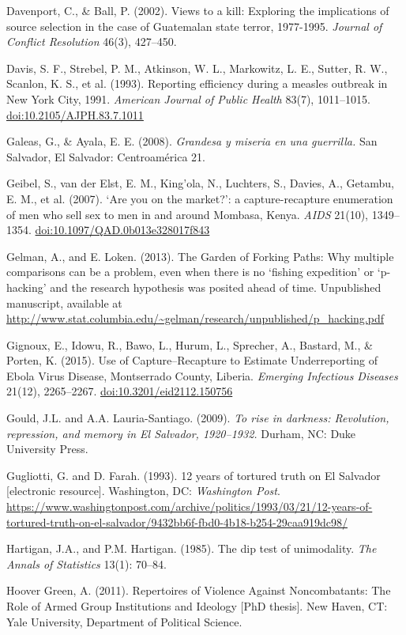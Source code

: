 \documentclass[11pt,]{article}
\begin{document}
Davenport, C., \& Ball, P. (2002). Views to a kill: Exploring the
implications of source selection in the case of Guatemalan state terror,
1977-1995. \emph{Journal of Conflict Resolution} 46(3), 427--450.

Davis, S. F., Strebel, P. M., Atkinson, W. L., Markowitz, L. E., Sutter,
R. W., Scanlon, K. S., et al. (1993). Reporting efficiency during a
measles outbreak in New York City, 1991. \emph{American Journal of
Public Health} 83(7), 1011--1015. \url{doi:10.2105/AJPH.83.7.1011}

Galeas, G., \& Ayala, E. E. (2008). \emph{Grandesa y miseria en una
guerrilla.} San Salvador, El Salvador: Centroamérica 21.

Geibel, S., van der Elst, E. M., King'ola, N., Luchters, S., Davies, A.,
Getambu, E. M., et al. (2007). `Are you on the market?': a
capture-recapture enumeration of men who sell sex to men in and around
Mombasa, Kenya. \emph{AIDS} 21(10), 1349--1354.
\url{doi:10.1097/QAD.0b013e328017f843}

Gelman, A., and E. Loken. (2013). The Garden of Forking Paths: Why
multiple comparisons can be a problem, even when there is no `fishing
expedition' or `p-hacking' and the research hypothesis was posited ahead
of time. Unpublished manuscript, available at
\url{http://www.stat.columbia.edu/~gelman/research/unpublished/p_hacking.pdf}

Gignoux, E., Idowu, R., Bawo, L., Hurum, L., Sprecher, A., Bastard, M.,
\& Porten, K. (2015). Use of Capture--Recapture to Estimate
Underreporting of Ebola Virus Disease, Montserrado County, Liberia.
\emph{Emerging Infectious Diseases} 21(12), 2265--2267.
\url{doi:10.3201/eid2112.150756}

Gould, J.L. and A.A. Lauria-Santiago. (2009). \emph{To rise in darkness:
Revolution, repression, and memory in El Salvador, 1920--1932.} Durham,
NC: Duke University Press.

Gugliotti, G. and D. Farah. (1993). 12 years of tortured truth on El
Salvador {[}electronic resource{]}. Washington, DC: \emph{Washington
Post}.
\url{https://www.washingtonpost.com/archive/politics/1993/03/21/12-years-of-tortured-truth-on-el-salvador/9432bb6f-fbd0-4b18-b254-29caa919dc98/}

Hartigan, J.A., and P.M. Hartigan. (1985). The dip test of unimodality.
\emph{The Annals of Statistics} 13(1): 70--84.

Hoover Green, A. (2011). Repertoires of Violence Against Noncombatants:
The Role of Armed Group Institutions and Ideology {[}PhD thesis{]}. New
Haven, CT: Yale University, Department of Political Science.
\end{document}

